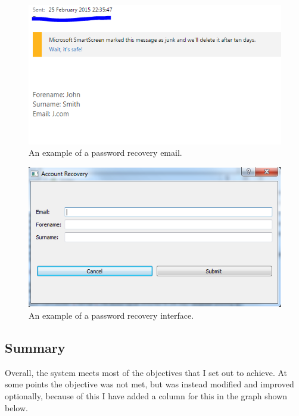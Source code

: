 \begin{figure}[H]
    \includegraphics[width=\textwidth]{./Testing/Images/ForgotPasswordValidationEmail.png}
    \caption{An example of a password recovery email.} 
\end{figure}

\begin{figure}[H]
    \includegraphics[width=\textwidth]{./Testing/Images/ForgotPassword.png}
    \caption{An example of a password recovery interface.} 
\end{figure}


\subsection{Summary}

Overall, the system meets most of the objectives that I set out to achieve. At some points the objective was not met, but was instead modified and improved optionally, because of this I have added a column for this in the graph shown below.

